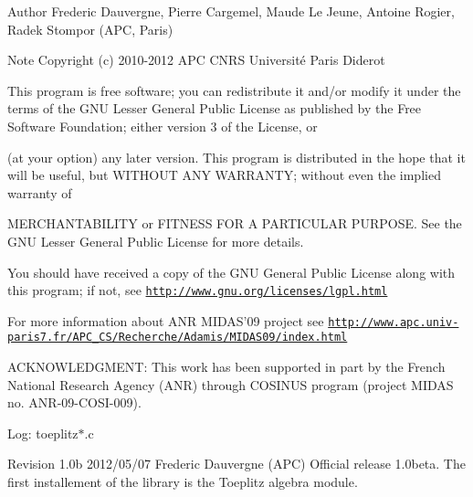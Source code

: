 \begin{DoxyAuthor}{Author}
Frederic Dauvergne, Pierre Cargemel, Maude Le Jeune, Antoine Rogier, Radek Stompor (A\-P\-C, Paris)
\end{DoxyAuthor}
\begin{DoxyNote}{Note}
Copyright (c) 2010-\/2012 A\-P\-C C\-N\-R\-S Université Paris Diderot 



This program is free software; you can redistribute it and/or modify it under the terms of the G\-N\-U Lesser General Public License as published by the Free Software Foundation; either version 3 of the License, or 

(at your option) any later version. This program is distributed in the hope that it will be useful, but W\-I\-T\-H\-O\-U\-T A\-N\-Y W\-A\-R\-R\-A\-N\-T\-Y; without even the implied warranty of 

M\-E\-R\-C\-H\-A\-N\-T\-A\-B\-I\-L\-I\-T\-Y or F\-I\-T\-N\-E\-S\-S F\-O\-R A P\-A\-R\-T\-I\-C\-U\-L\-A\-R P\-U\-R\-P\-O\-S\-E. See the G\-N\-U Lesser General Public License for more details. 



You should have received a copy of the G\-N\-U General Public License along with this program; if not, see \href{http://www.gnu.org/licenses/lgpl.html}{\tt http\-://www.\-gnu.\-org/licenses/lgpl.\-html}

For more information about A\-N\-R M\-I\-D\-A\-S'09 project see \href{http://www.apc.univ-paris7.fr/APC_CS/Recherche/Adamis/MIDAS09/index.html}{\tt http\-://www.\-apc.\-univ-\/paris7.\-fr/\-A\-P\-C\-\_\-\-C\-S/\-Recherche/\-Adamis/\-M\-I\-D\-A\-S09/index.\-html}

A\-C\-K\-N\-O\-W\-L\-E\-D\-G\-M\-E\-N\-T\-: This work has been supported in part by the French National Research Agency (A\-N\-R) through C\-O\-S\-I\-N\-U\-S program (project M\-I\-D\-A\-S no. A\-N\-R-\/09-\/\-C\-O\-S\-I-\/009).
\end{DoxyNote}
Log\-: toeplitz$\ast$.c

Revision 1.\-0b 2012/05/07 Frederic Dauvergne (A\-P\-C) Official release 1.\-0beta. The first installement of the library is the Toeplitz algebra module.

